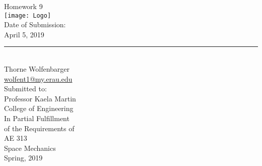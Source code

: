 \begin{center}
  {\huge Homework 9}\\
  \vspace{10px}
  \texttt{[image: Logo]} \\
  Date of Submission:\\
  April 5, 2019\\
  \vspace{30px}
  \rule{300px}{0.5px} \\
  Thorne Wolfenbarger \\
  \href{mailto:wolfent1@my.erau.edu}{wolfent1@my.erau.edu} \\
  \vspace{30px}
  Submitted to: \\
  Professor Kaela Martin \\
  College of Engineering \\
  \vspace{40px}
  In Partial Fulfillment \\
  of the Requirements of \\
  \vspace{10px}
  AE 313 \\
  Space Mechanics \\
  Spring, 2019 \\
\end{center}
